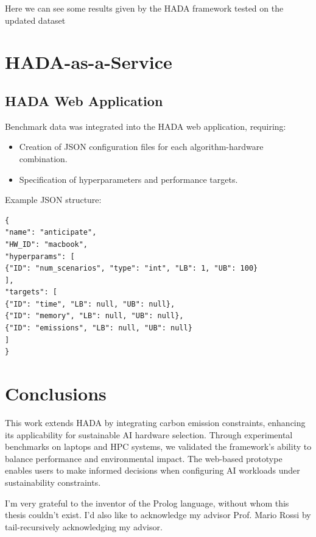 \documentclass[a4paper,singleside,12pt]{report} %
\begin{document}
Here we can see some results given by the HADA framework tested on the updated dataset



\chapter{HADA-as-a-Service}

\section{HADA Web Application}
Benchmark data was integrated into the HADA web application, requiring:
\begin{itemize}
\item Creation of JSON configuration files for each algorithm-hardware combination.
\item Specification of hyperparameters and performance targets.
\end{itemize}

Example JSON structure:
\begin{verbatim}
{
"name": "anticipate",
"HW_ID": "macbook",
"hyperparams": [
{"ID": "num_scenarios", "type": "int", "LB": 1, "UB": 100}
],
"targets": [
{"ID": "time", "LB": null, "UB": null},
{"ID": "memory", "LB": null, "UB": null},
{"ID": "emissions", "LB": null, "UB": null}
]
}
\end{verbatim}

\chapter{Conclusions}

This work extends HADA by integrating carbon emission constraints, enhancing its applicability 
for sustainable AI hardware selection. Through experimental benchmarks on laptops and HPC systems, 
we validated the framework’s ability to balance performance and environmental impact. The web-based prototype 
enables users to make informed decisions when configuring AI workloads under sustainability constraints.

\appendix

\printbibliography[heading=bibintoc] %

\acknowledgements
I'm very grateful to the inventor of the Prolog language, without whom this thesis couldn't exist. I'd also like 
to acknowledge my advisor Prof. Mario Rossi by tail-recursively acknowledging my advisor.
	
\end{document}
